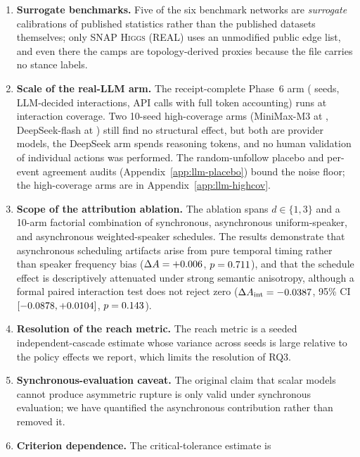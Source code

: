 \begin{enumerate}
    \item \textbf{Surrogate benchmarks.} Five of the six benchmark networks are
    \emph{surrogate} calibrations of published statistics rather than the published datasets
    themselves; only \textsc{SNAP Higgs (REAL)} uses an unmodified public edge list, and even
    there the camps are topology-derived proxies because the file carries no stance labels.
    \item \textbf{Scale of the real-LLM arm.} The receipt-complete Phase~6 arm
    (\LlmArmSeeds{} seeds, \LlmArmDecidedEvents{} LLM-decided interactions,
    \LlmArmApiCalls{} API calls with full token accounting) runs at
    \LlmArmCoverage{} interaction coverage. Two 10-seed high-coverage arms
    (MiniMax-M3 at \LlmHighCovCoverage{}, DeepSeek-flash at \LlmDeepSeekCoverage{}) still
    find no structural effect, but both are provider models, the DeepSeek arm spends
    reasoning tokens, and no human validation of individual actions was performed. The
    random-unfollow placebo and per-event agreement audits (Appendix~\ref{app:llm-placebo})
    bound the noise floor; the high-coverage arms are in Appendix~\ref{app:llm-highcov}.
    \item \textbf{Scope of the attribution ablation.} The ablation spans $d \in \{1,3\}$ and
    a 10-arm factorial combination of synchronous, asynchronous uniform-speaker, and
    asynchronous weighted-speaker schedules. The results demonstrate that asynchronous
    scheduling artifacts arise from pure temporal timing rather than speaker frequency bias
    ($\Delta A = +0.006$, $p = 0.711$), and that the schedule effect
    is descriptively attenuated under strong semantic anisotropy, although a formal paired
    interaction test does not reject zero ($\Delta A_{\mathrm{int}} = -0.0387$,
    95\% CI $[-0.0878, +0.0104]$,
    $p = 0.143$).
    \item \textbf{Resolution of the reach metric.} The reach metric is a seeded
    independent-cascade estimate whose variance across seeds is large relative to the policy
    effects we report, which limits the resolution of RQ3.
    \item \textbf{Synchronous-evaluation caveat.} The original claim that scalar models cannot
    produce asymmetric rupture is only valid under synchronous evaluation; we have quantified
    the asynchronous contribution rather than removed it.
    \item \textbf{Criterion dependence.} The critical-tolerance estimate is

\end{enumerate}

